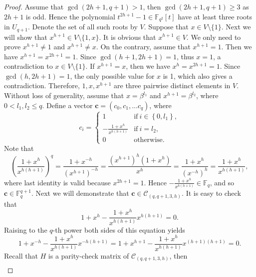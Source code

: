 \documentclass[10pt]{article}%
\begin{document}
\begin{proof}
		Assume that $\gcd(2h+1,q+1)>1$, then $\gcd(2h+1,q+1)\ge3$ as $2h+1$ is odd. Hence the polynomial $t^{2h+1}-1\in\mathbb{F}_{q^2}[t]$ have at least three roots in $U_{q+1}$. Denote the set of all such roots by $V$. Suppose that $x\in V\setminus\{1\}$. Next we will show that $x^{h+1}\in V\setminus\{1,x\}$. It is obvious that $x^{h+1}\in V$. We only need to prove $x^{h+1}\ne1$ and $x^{h+1}\ne x$. On the contrary, assume that $x^{h+1}=1$. Then we have $x^{h+1}=x^{2h+1}=1$. Since $\gcd(h+1,2h+1)=1$, thus $x=1$, a contradiction to $x\in V\setminus\{1\}$. If $x^{h+1}= x$, then we have $x^{h}=x^{2h+1}=1$. Since $\gcd(h,2h+1)=1$,  the only possible value for $x$ is 1, which also gives a contradiction. Therefore, $1,x,x^{h+1}$ are three pairwise distinct elements in $V$. Without loss of generality, assume that $x=\beta^{l_1}$ and $x^{h+1}=\beta^{l_2}$, where $0<l_1,l_2\le q$. Define a vector $\mathbf{c}=(c_0,c_1,...c_q)$, where
		\begin{equation*}
			\left.c_i=\left\{\begin{array}{ll}1&\text{if}~i\in\left\{0,l_1\right\},\\-\frac{1+x^h}{x^{h(h+1)}}&\text{if}~i=l_2,\\0&\text{otherwise}.\end{array}\right.\right.
		\end{equation*}
		Note that 
		\begin{equation*}
			\left(\frac{1+x^h}{x^{h(h+1)}}\right)^q=\frac{1+x^{-h}}{(x^{h+1})^{-h}}=\frac{(x^{h+1})^{h}(1+x^{h})}{x^h}=\frac{1+x^{h}}{(x^{-h})^{h}}=\frac{1+x^{h}}{x^{h(h+1)}},
		\end{equation*}
		where last identity is valid because $x^{2h+1}=1$. Hence $-\frac{1+x^h}{x^{h(h+1)}}\in\mathbb{F}_q$, and so $\mathbf{c}\in\mathbb{F}_q^{q+1}$. Next we will demonstrate that $\mathbf{c}\in\mathcal{C}_{(q,q+1,3,h)}$. 
		It is easy to check that 
		\begin{equation}\label{sec3 thm1 equ1}
			1+x^h-\frac{1+x^h}{x^{h(h+1)}}x^{h(h+1)}=0.
		\end{equation}
		Raising to the $q$-th power both sides of this equation yields 
		\begin{equation}\label{sec3 thm1 equ2}
			1+x^{-h}-\frac{1+x^h}{x^{h(h+1)}}x^{-h(h+1)}=1+x^{h+1}-\frac{1+x^h}{x^{h(h+1)}}x^{(h+1)(h+1)}=0.
		\end{equation}
		Recall that $H$ is a parity-check matrix of $\mathcal{C}_{(q,q+1,3,h)}$, then
		\begin{equation*}
			\begin{aligned}

\end{aligned}
\end{equation*}
\end{proof}
\end{document}
